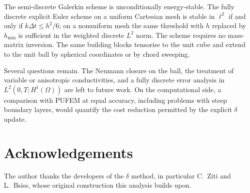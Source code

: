 \documentclass[final,3p,times]{elsarticle}
\theoremstyle{plain}
\theoremstyle{definition}
\theoremstyle{remark}
\newcommand{\dziti}{\ensuremath{\delta}\text{-Ziti}}
\begin{document}
The semi-discrete Galerkin scheme is unconditionally energy-stable. The fully
discrete explicit Euler scheme on a uniform Cartesian mesh is stable in
$\ell^2$ if and only if $k\Delta t\le h^2/6$; on a nonuniform mesh the same
threshold with $h$ replaced by $h_{\min}$ is sufficient in the weighted
discrete $L^2$ norm. The scheme requires no mass-matrix inversion. The same
building blocks tensorise to the unit cube and extend to the unit ball by
spherical coordinates or by chord sweeping.

Several questions remain. The Neumann closure on the ball, the treatment of
variable or anisotropic conductivities, and a fully discrete error analysis
in $L^2(0,T;H^1(\Omega))$ are left to future work. On the computational side,
a comparison with PUFEM \cite{Malek2019,Mohamed2013} at equal accuracy,
including problems with steep boundary layers, would quantify the cost
reduction permitted by the explicit \dziti{} update.

\section*{Acknowledgements}

The author thanks the developers of the \dziti{} method, in particular
C.~Ziti and L.~Bsiss, whose original construction this analysis builds upon.



\end{document}
